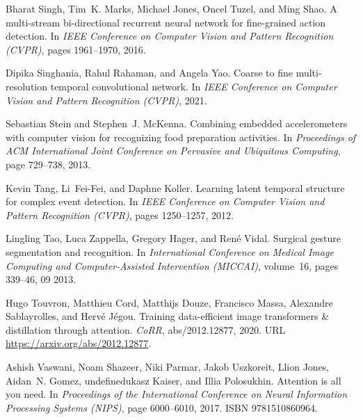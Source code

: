 \documentclass{bmvc2k}
\begin{document}
\begin{thebibliography}{53}
Bharat Singh, Tim~K. Marks, Michael Jones, Oncel Tuzel, and Ming Shao.
\newblock A multi-stream bi-directional recurrent neural network for
  fine-grained action detection.
\newblock In \emph{{IEEE} Conference on Computer Vision and Pattern Recognition
  (CVPR)}, pages 1961--1970, 2016.

Dipika Singhania, Rahul Rahaman, and Angela Yao.
\newblock Coarse to fine multi-resolution temporal convolutional network.
\newblock In \emph{IEEE Conference on Computer Vision and Pattern Recognition
  (CVPR)}, 2021.

Sebastian Stein and Stephen~J. McKenna.
\newblock Combining embedded accelerometers with computer vision for
  recognizing food preparation activities.
\newblock In \emph{Proceedings of ACM International Joint Conference on
  Pervasive and Ubiquitous Computing}, page 729–738, 2013.

Kevin Tang, Li~Fei-Fei, and Daphne Koller.
\newblock Learning latent temporal structure for complex event detection.
\newblock In \emph{{IEEE} Conference on Computer Vision and Pattern Recognition
  (CVPR)}, pages 1250--1257, 2012.

Lingling Tao, Luca Zappella, Gregory Hager, and René Vidal.
\newblock Surgical gesture segmentation and recognition.
\newblock In \emph{International Conference on Medical Image Computing and
  Computer-Assisted Intervention (MICCAI)}, volume~16, pages 339--46, 09 2013.

Hugo Touvron, Matthieu Cord, Matthijs Douze, Francisco Massa, Alexandre
  Sablayrolles, and Herv{\'{e}} J{\'{e}}gou.
\newblock Training data-efficient image transformers {\&} distillation through
  attention.
\newblock \emph{CoRR}, abs/2012.12877, 2020.
\newblock URL \url{https://arxiv.org/abs/2012.12877}.

Ashish Vaswani, Noam Shazeer, Niki Parmar, Jakob Uszkoreit, Llion Jones,
  Aidan~N. Gomez, undefinedukasz Kaiser, and Illia Polosukhin.
\newblock Attention is all you need.
\newblock In \emph{Proceedings of the International Conference on Neural
  Information Processing Systems (NIPS)}, page 6000–6010, 2017.
\newblock ISBN 9781510860964.


\end{thebibliography}
\end{document}
